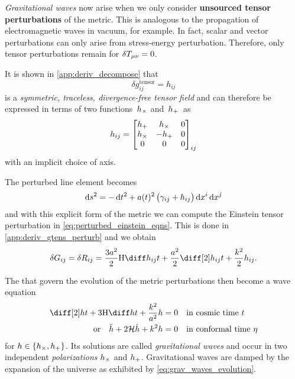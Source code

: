 \documentclass[parskip=half]{scrreprt}
\begin{document}
\emph{Gravitational waves} now arise when we only consider \textbf{unsourced tensor perturbations} of the metric. This is analogous to the propagation of electromagnetic waves in vacuum, for example.  In fact, scalar and vector perturbations can only arise from stress-energy perturbation.  Therefore, only tensor perturbations remain for \(\delta T_{\mu \nu}=0\).

It is shown in \autoref{app:deriv_decompose} that
\begin{equation}
	\delta g^{\mathrm{tensor}}_{ij} = h_{ij}
\end{equation}
is a \emph{symmetric, traceless, divergence-free tensor field} and can therefore be expressed in terms of two functions~\(h_\times\) and~\(h_+\)~as
\begin{equation}
	h_{ij} =
	\begin{bmatrix}
		h_+ & h_\times & 0 \\
		h_\times & -h_+ & 0 \\
		0 & 0 & 0
	\end{bmatrix}_{ij}
\end{equation}
with an implicit choice of axis.

The perturbed line element becomes
\begin{equation}
	\dif{s}^2 = -\dif{t}^2 + a(t)^2 \del{\gamma_{ij} + h_{ij}} \dif{x^i}\dif{x^j}
\end{equation}
and with this explicit form of the metric we can compute the Einstein tensor perturbation in \eqref{eq:perturbed_einstein_eqns}. This is done in \autoref{app:deriv_gtens_perturb} and we obtain
\begin{align}\label{eq:evolution}
	\delta\Gtens_{ij} = \delta\Rtens_{ij} = \frac{3 a^2}{2} \Hcosm \dt{h_{ij}} + \frac{a^2}{2}\ddt{h_{ij}} + \frac{k^2}{2}h_{ij} \eqpunct{.}
\end{align}

The  that govern the evolution of the metric perturbations then become a wave equation 
\begin{subequations}\label{eq:grav_waves_evolution}
\begin{align}
	\ddt{h} + 3 \Hcosm \dt{h} + \frac{k^2}{a^2} h &= 0 \quad \text{in cosmic time \(t\)} \\
	\text{or} \quad \ddconf{h} + 2 \Hconf \dconf{h} + k^2 h &= 0 \quad \text{in conformal time \(\conft\)}
\end{align}
\end{subequations}
for \(h \in \cbr{\hcross, \hplus}\). Its solutions are called \emph{gravitational waves} and occur in two independent \emph{polarizations} \(h_\times\) and \(h_+\). Gravitational waves are damped by the expansion of the universe as exhibited by \eqref{eq:grav_waves_evolution}.
\end{document}
